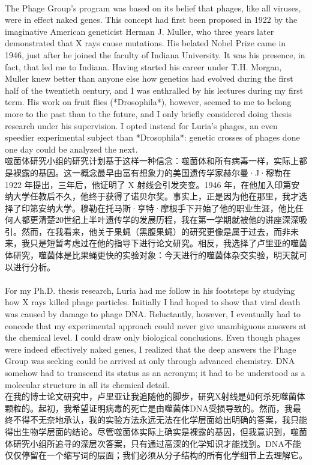 \documentclass{article}
\begin{document}
\\
The Phage Group’s program was based on its belief that phages, like all viruses, were in effect naked genes. This concept had first been proposed in 1922 by the imaginative American geneticist Herman J. Muller, who three years later demonstrated that X rays cause mutations. His belated Nobel Prize came in 1946, just after he joined the faculty of Indiana University. It was his presence, in fact, that led me to Indiana. Having started his career under T.H. Morgan, Muller knew better than anyone else how genetics had evolved during the first half of the twentieth century, and I was enthralled by his lectures during my first term. His work on fruit flies (*Drosophila*), however, seemed to me to belong more to the past than to the future, and I only briefly considered doing thesis research under his supervision. I opted instead for Luria’s phages, an even speedier experimental subject than *Drosophila*: genetic crosses of phages done one day could be analyzed the next.\\
噬菌体研究小组的研究计划基于这样一种信念：噬菌体和所有病毒一样，实际上都是裸露的基因。这一概念最早由富有想象力的美国遗传学家赫尔曼·J·穆勒在1922 年提出，三年后，他证明了 X 射线会引发突变。1946 年，在他加入印第安纳大学任教后不久，他终于获得了诺贝尔奖。事实上，正是因为他在那里，我才选择了印第安纳大学。穆勒在托马斯·亨特·摩根手下开始了他的职业生涯，他比任何人都更清楚20世纪上半叶遗传学的发展历程，我在第一学期就被他的讲座深深吸引。然而，在我看来，他关于果蝇（黑腹果蝇）的研究更像是属于过去，而非未来，我只是短暂考虑过在他的指导下进行论文研究。相反，我选择了卢里亚的噬菌体研究，噬菌体是比果蝇更快的实验对象：今天进行的噬菌体杂交实验，明天就可以进行分析。\\

\\
For my Ph.D. thesis research, Luria had me follow in his footsteps by studying how X rays killed phage particles. Initially I had hoped to show that viral death was caused by damage to phage DNA. Reluctantly, however, I eventually had to concede that my experimental approach could never give unambiguous answers at the chemical level. I could draw only biological conclusions. Even though phages were indeed effectively naked genes, I realized that the deep answers the Phage Group was seeking could be arrived at only through advanced chemistry. DNA somehow had to transcend its status as an acronym; it had to be understood as a molecular structure in all its chemical detail.\\
在我的博士论文研究中，卢里亚让我追随他的脚步，研究X射线是如何杀死噬菌体颗粒的。起初，我希望证明病毒的死亡是由噬菌体DNA受损导致的。然而，我最终不得不无奈地承认，我的实验方法永远无法在化学层面给出明确的答案，我只能得出生物学层面的结论。尽管噬菌体实际上确实是裸露的基因，但我意识到，噬菌体研究小组所追寻的深层次答案，只有通过高深的化学知识才能找到。DNA不能仅仅停留在一个缩写词的层面；我们必须从分子结构的所有化学细节上去理解它。\\
\end{document}
